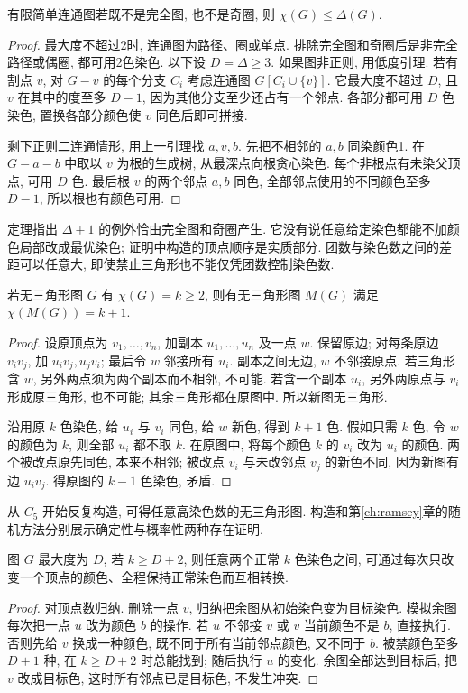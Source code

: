 \begin{theorem}[Brooks]\label{thm:brooks}
有限简单连通图若既不是完全图, 也不是奇圈, 则 $\chi(G)\le\Delta(G)$.
\end{theorem}
\begin{proof}
最大度不超过2时, 连通图为路径、圈或单点. 排除完全图和奇圈后是非完全路径或偶圈, 都可用2色染色. 以下设 $D=\Delta\ge3$. 如果图非正则, 用低度引理. 若有割点 $v$, 对 $G-v$ 的每个分支 $C_i$ 考虑连通图 $G[C_i\cup\{v\}]$. 它最大度不超过 $D$, 且 $v$ 在其中的度至多 $D-1$, 因为其他分支至少还占有一个邻点. 各部分都可用 $D$ 色染色, 置换各部分颜色使 $v$ 同色后即可拼接.

剩下正则二连通情形, 用上一引理找 $a,v,b$. 先把不相邻的 $a,b$ 同染颜色1. 在 $G-a-b$ 中取以 $v$ 为根的生成树, 从最深点向根贪心染色. 每个非根点有未染父顶点, 可用 $D$ 色. 最后根 $v$ 的两个邻点 $a,b$ 同色, 全部邻点使用的不同颜色至多 $D-1$, 所以根也有颜色可用.
\end{proof}
定理指出 $\Delta+1$ 的例外恰由完全图和奇圈产生. 它没有说任意给定染色都能不加颜色局部改成最优染色; 证明中构造的顶点顺序是实质部分.
团数与染色数之间的差距可以任意大, 即使禁止三角形也不能仅凭团数控制染色数.
\begin{theorem}
若无三角形图 $G$ 有 $\chi(G)=k\ge2$, 则有无三角形图 $M(G)$ 满足 $\chi(M(G))=k+1$.
\end{theorem}
\begin{proof}
设原顶点为 $v_1,\ldots,v_n$, 加副本 $u_1,\ldots,u_n$ 及一点 $w$. 保留原边; 对每条原边 $v_iv_j$, 加 $u_iv_j,u_jv_i$; 最后令 $w$ 邻接所有 $u_i$. 副本之间无边, $w$ 不邻接原点. 若三角形含 $w$, 另外两点须为两个副本而不相邻, 不可能. 若含一个副本 $u_i$, 另外两原点与 $v_i$ 形成原三角形, 也不可能; 其余三角形都在原图中. 所以新图无三角形.

沿用原 $k$ 色染色, 给 $u_i$ 与 $v_i$ 同色, 给 $w$ 新色, 得到 $k+1$ 色. 假如只需 $k$ 色, 令 $w$ 的颜色为 $k$, 则全部 $u_i$ 都不取 $k$. 在原图中, 将每个颜色 $k$ 的 $v_i$ 改为 $u_i$ 的颜色. 两个被改点原先同色, 本来不相邻; 被改点 $v_i$ 与未改邻点 $v_j$ 的新色不同, 因为新图有边 $u_iv_j$. 得原图的 $k-1$ 色染色, 矛盾.
\end{proof}
从 $C_5$ 开始反复构造, 可得任意高染色数的无三角形图. 构造和第\ref{ch:ramsey}章的随机方法分别展示确定性与概率性两种存在证明.
\begin{theorem}\label{thm:recolor}
图 $G$ 最大度为 $D$, 若 $k\ge D+2$, 则任意两个正常 $k$ 色染色之间, 可通过每次只改变一个顶点的颜色、全程保持正常染色而互相转换.
\end{theorem}
\begin{proof}
对顶点数归纳. 删除一点 $v$, 归纳把余图从初始染色变为目标染色. 模拟余图每次把一点 $u$ 改为颜色 $b$ 的操作. 若 $u$ 不邻接 $v$ 或 $v$ 当前颜色不是 $b$, 直接执行. 否则先给 $v$ 换成一种颜色, 既不同于所有当前邻点颜色, 又不同于 $b$. 被禁颜色至多 $D+1$ 种, 在 $k\ge D+2$ 时总能找到; 随后执行 $u$ 的变化. 余图全部达到目标后, 把 $v$ 改成目标色, 这时所有邻点已是目标色, 不发生冲突.
\end{proof}
